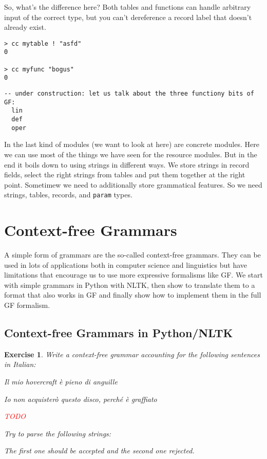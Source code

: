 \documentclass{scrartcl}
\newcommand{\note}[1]{\textcolor{red}{\uppercase{#1}}}
\newtheorem{exercise}{Exercise}
\begin{document}
So, what's the difference here? Both tables and functions can handle arbitrary input of the correct type, but you can't dereference a record label that doesn't already exist.

\begin{verbatim}
> cc mytable ! "asfd"
0

> cc myfunc "bogus"
0
\end{verbatim}


\begin{verbatim}
-- under construction: let us talk about the three functiony bits of GF:
  lin
  def
  oper
\end{verbatim}

In the last kind of modules (we want to look at here) are concrete modules. Here we can use most of the things we have seen for the resource modules. But in the end it boils down to using strings in different ways. We store strings in record fields, select the right strings from tables and put them together at the right point. Sometimew we need to additionally store grammatical features. So we need strings, tables, records, and \texttt{param} types.



\section{Context-free Grammars}

A simple form of grammars are the so-called context-free grammars. They can be used in lots of applications both in computer science and linguistics but have limitations that encourage us to use more expressive formalisms like GF. We start with simple grammars in Python with NLTK, then show to translate them to a format that also works in GF and finally show how to implement them in the full GF formalism.

\subsection{Context-free Grammars in Python/NLTK}



\begin{exercise}
  Write a context-free grammar accounting for the following sentences in Italian:

  Il mio hovercraft è pieno di anguille
  
  Io non acquisterò questo disco, perché è graffiato
  
\note{todo}

  Try to parse the following strings:

  
  
  The first one should be accepted and the second one rejected.

\end{exercise}
\end{document}

